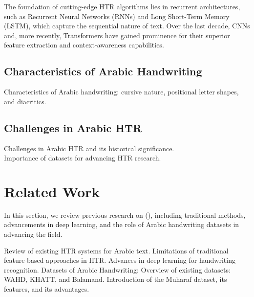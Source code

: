 \documentclass[conference]{IEEEtran}
\begin{document}
The foundation of cutting-edge HTR algorithms lies in recurrent architectures, such as Recurrent Neural Networks (RNNs) and Long Short-Term Memory (LSTM), which capture the sequential nature of text. Over the last decade, CNNs and, more recently, Transformers have gained prominence for their superior feature extraction and context-awareness capabilities.




\subsection{Characteristics of Arabic Handwriting}

Characteristics of Arabic handwriting: cursive nature, positional letter shapes, and diacritics. \\

\subsection{Challenges in Arabic HTR}

Challenges in Arabic HTR and its historical significance. \\



Importance of datasets for advancing HTR research. \\

\clearpage













\section{Related Work}
In this section, we review previous research on (), including traditional methods, advancements in deep learning, and the role of Arabic handwriting datasets in advancing the field.

Review of existing HTR systems for Arabic text.
Limitations of traditional feature-based approaches in HTR.
Advances in deep learning for handwriting recognition.
Datasets of Arabic Handwriting:
Overview of existing datasets: WAHD, KHATT, and Balamand.
Introduction of the Muharaf dataset, its features, and its advantages.


\blindtext[3]

\subsection{}
\end{document}
